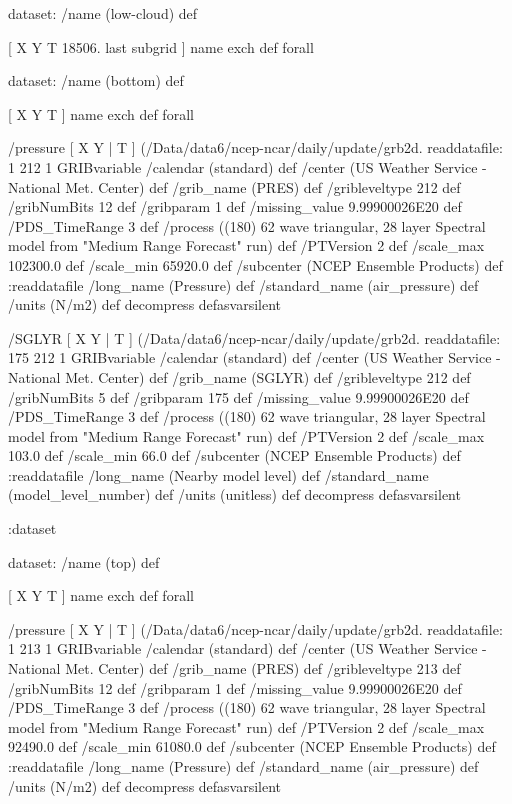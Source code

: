 \begin{ingrid}

 dataset: /name (low-cloud) def

  [ X Y T 18506. last subgrid ] { name exch def } forall

  dataset: /name (bottom) def

   [ X Y T ] { name exch def } forall

   /pressure { [ X Y | T ] (/Data/data6/ncep-ncar/daily/update/grb2d.%
   readdatafile:
   1 212 1 GRIBvariable
   /calendar (standard) def
   /center (US Weather Service - National Met. Center) def
   /grib_name (PRES) def
   /gribleveltype 212 def
   /gribNumBits 12 def
   /gribparam 1 def
   /missing_value 9.99900026E20 def
   /PDS_TimeRange 3 def
   /process ((180) 62 wave triangular, 28 layer Spectral model from "Medium Range Forecast" run) def
   /PTVersion 2 def
   /scale_max 102300.0 def
   /scale_min 65920.0 def
   /subcenter (NCEP Ensemble Products) def
   :readdatafile
   /long_name (Pressure) def
   /standard_name (air_pressure) def
   /units (N/m2) def
   decompress
   } defasvarsilent

   /SGLYR { [ X Y | T ] (/Data/data6/ncep-ncar/daily/update/grb2d.%
   readdatafile:
   175 212 1 GRIBvariable
   /calendar (standard) def
   /center (US Weather Service - National Met. Center) def
   /grib_name (SGLYR) def
   /gribleveltype 212 def
   /gribNumBits 5 def
   /gribparam 175 def
   /missing_value 9.99900026E20 def
   /PDS_TimeRange 3 def
   /process ((180) 62 wave triangular, 28 layer Spectral model from "Medium Range Forecast" run) def
   /PTVersion 2 def
   /scale_max 103.0 def
   /scale_min 66.0 def
   /subcenter (NCEP Ensemble Products) def
   :readdatafile
   /long_name (Nearby model level) def
   /standard_name (model_level_number) def
   /units (unitless) def
   decompress
   } defasvarsilent

  :dataset

  dataset: /name (top) def

   [ X Y T ] { name exch def } forall

   /pressure { [ X Y | T ] (/Data/data6/ncep-ncar/daily/update/grb2d.%
   readdatafile:
   1 213 1 GRIBvariable
   /calendar (standard) def
   /center (US Weather Service - National Met. Center) def
   /grib_name (PRES) def
   /gribleveltype 213 def
   /gribNumBits 12 def
   /gribparam 1 def
   /missing_value 9.99900026E20 def
   /PDS_TimeRange 3 def
   /process ((180) 62 wave triangular, 28 layer Spectral model from "Medium Range Forecast" run) def
   /PTVersion 2 def
   /scale_max 92490.0 def
   /scale_min 61080.0 def
   /subcenter (NCEP Ensemble Products) def
   :readdatafile
   /long_name (Pressure) def
   /standard_name (air_pressure) def
   /units (N/m2) def
   decompress
   } defasvarsilent


\end{ingrid}
